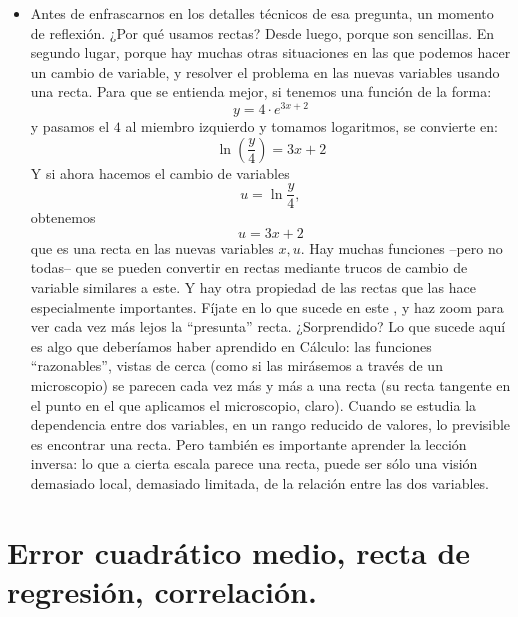 \begin{itemize}
    \item Antes de enfrascarnos en los detalles técnicos de esa pregunta, un momento de reflexión. ¿Por qué usamos rectas? Desde luego, porque son sencillas. En segundo lugar, porque hay muchas otras situaciones en las que podemos hacer un cambio de variable, y resolver el problema en las nuevas variables usando una recta. Para que se entienda mejor, si tenemos una función de la forma:
        \[y=4\cdot e^{3x+2}\]
        y pasamos el $4$ al miembro izquierdo y tomamos logaritmos, se convierte en:
        \[\ln\left(\dfrac{y}{4}\right)=3x+2\]
        Y si ahora hacemos el cambio de variables \[u=\ln\frac{y}{4},\]
        obtenemos
        \[u=3x+2\]
        que es una recta en las nuevas variables $x,u$. Hay muchas funciones --pero no todas-- que se pueden convertir en rectas mediante trucos de cambio de variable similares a este. Y hay otra propiedad de las rectas que las hace especialmente importantes. Fíjate en lo que sucede en este , y haz zoom para ver cada vez más lejos la ``presunta'' recta. ¿Sorprendido? Lo que sucede aquí es algo que deberíamos haber aprendido en Cálculo: las funciones ``razonables'', vistas de cerca (como si las mirásemos a través de un microscopio) se parecen cada vez más y más a una recta (su recta tangente en el punto en el que aplicamos el microscopio, claro). Cuando se estudia la dependencia entre dos variables, en un rango reducido de valores, lo previsible es encontrar una recta. Pero también es importante aprender la lección inversa: lo que a cierta escala parece una recta, puede ser sólo una visión demasiado local, demasiado limitada, de la relación entre las dos variables.
    \end{itemize}

\section{Error cuadrático medio, recta de regresión, correlación.}

